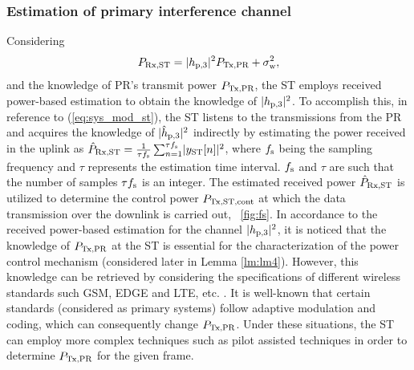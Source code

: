 \subsubsection{Estimation of primary interference channel}
Considering
\begin{equation}
P_{\text{Rx,ST}} = |h_{\text{p,3}}|^2 P_{\text{Tx,PR}} + \sigma^2_{\text{w}} \label{eq:prcvd}, 
\end{equation}
and the knowledge of PR's transmit power $P_{\text{Tx,PR}}$, the ST employs received power-based estimation to obtain the knowledge of $|h_{\text{p,3}}|^2$. To accomplish this, in reference to (\ref{eq:sys_mod_st}), the ST listens to the transmissions from the PR and acquires the knowledge of $|\hat{h}_{\text{p,3}}|^2$ indirectly by estimating the power received in the uplink as $\hat{P}_{\text{Rx,ST}} = {\frac{1}{{\tau f_{\text{s}}}}\sum_{n=1}^{\tau f_{\text{s}}}} {|y_{\text{ST}}[n]|^2}$, where $f_{\text{s}}$ being the sampling frequency and $\tau$ represents the estimation time interval. $f_{\text{s}}$ and $\tau$ are such that the number of samples $\tau f_{\text{s}}$ is an integer. The estimated received power $\hat{P}_{\text{Rx,ST}}$ is utilized to determine the control power $P_{\text{Tx,ST,cont}}$ at which the data transmission over the downlink is carried out, \figurename~\ref{fig:fs}. In accordance to the received power-based estimation for the channel $|h_{\text{p,3}}|^2$, it is noticed that the knowledge of $P_{\text{Tx,PR}}$ at the ST is essential for the characterization of the power control mechanism (considered later in Lemma \ref{lm:lm4}). However, this knowledge can be retrieved by considering the specifications of different wireless standards such GSM, EDGE and LTE, etc. \cite{Sharma14}. It is well-known that certain standards (considered as primary systems) follow adaptive modulation and coding, which can consequently change $P_{\text{Tx,PR}}$. Under these situations, the ST can employ more complex techniques such as pilot assisted techniques in order to determine $P_{\text{Tx,PR}}$ for the given frame.


